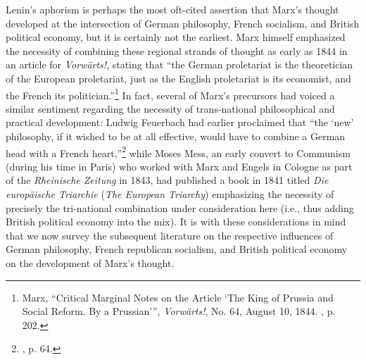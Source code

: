Lenin's aphorism is perhaps the most oft-cited assertion that Marx's thought developed at the intersection of German philosophy, French socialism, and British political economy, but it is certainly not the earliest. Marx himself emphasized the necessity of combining these regional strands of thought as early as 1844 in an article for \textit{Vorwärts!}, stating that ``the German proletariat is the theoretician of the European proletariat, just as the English proletariat is its economist, and the French its politician.''\footnote{Marx, ``Critical Marginal Notes on the Article `The King of Prussia and Social Reform. By a Prussian'{}'', \textit{Vorwärts!}, No. 64, August 10, 1844. , p. 202.} In fact, several of Marx's precursors had voiced a similar sentiment regarding the necessity of trans-national philosophical and practical development: Ludwig Feuerbach had earlier proclaimed that ``the `new' philosophy, if it wished to be at all effective, would have to combine a German head with a French heart,''\footnote{\cite{mclellan_karl_1973}, p. 64.} while Moses Mess, an early convert to Communism (during his time in Paris) who worked with Marx and Engels in Cologne as part of the \textit{Rheinische Zeitung} in 1843, had published a book in 1841 titled \textit{Die europäische Triarchie} (\textit{The European Triarchy}) \parencite{hess_europaische_1841} emphasizing the necessity of precisely the tri-national combination under consideration here (i.e., thus adding British political economy into the mix). It is with these considerations in mind that we now survey the subsequent literature on the respective influences of German philosophy, French republican socialism, and British political economy on the development of Marx's thought.
